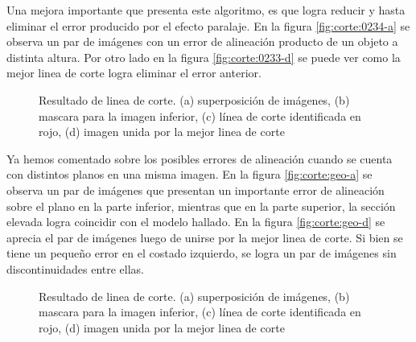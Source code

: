 Una mejora importante que presenta este algoritmo, es que logra reducir y hasta eliminar el error producido por el efecto paralaje. En la figura \ref{fig:corte:0234-a} se observa un par de imágenes con un error de alineación producto de un objeto a distinta altura. Por otro lado en la figura \ref{fig:corte:0233-d} se puede ver como la mejor linea de corte logra eliminar el error anterior.

\begin{figure}[H]
	\centering     %
	\hspace{0.05\textwidth}%
	
	
	\caption[Resultado de linea de corte: \textit{Chuspa}]{Resultado de linea de corte. (a) superposición de imágenes, (b) mascara para la imagen inferior, (c) línea de corte identificada en rojo, (d) imagen unida por la mejor linea de corte}
	\label{imagen:cut:0234}
\end{figure}

Ya hemos comentado sobre los posibles errores de alineación cuando se cuenta con distintos planos en una misma imagen. En la figura \ref{fig:corte:geo-a} se observa un par de imágenes que presentan un importante error de alineación sobre el plano en la parte inferior, mientras que en la parte superior, la sección elevada logra coincidir con el modelo hallado. En la figura \ref{fig:corte:geo-d} se aprecia el par de imágenes luego de unirse por la mejor linea de corte. Si bien se tiene un pequeño error en el costado izquierdo, se logra un par de imágenes sin discontinuidades entre ellas.

\begin{figure}[H]
	\centering     %
	\hspace{0.1\textwidth}%
	
	
	\caption[Resultado de linea de corte: \textit{Grava}]{Resultado de linea de corte. (a) superposición de imágenes, (b) mascara para la imagen inferior, (c) línea de corte identificada en rojo, (d) imagen unida por la mejor linea de corte}
	\label{imagen:cut:geo}
\end{figure}


